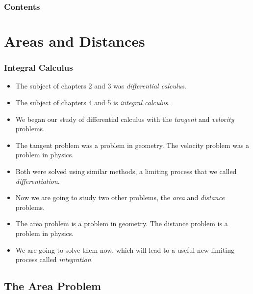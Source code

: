 \documentclass[serif,ignorenonframetext]{beamer}
\title{\commonTitleZeroFourOne}
\subtitle{\commonSubtitleZeroFourOne}
\author{\commonAuthor}
\institute{\commonInstitute}
\date{\commonDateZeroFourOne}
\begin{document}

\begin{frame}
  \titlepage
\end{frame}

\begin{frame}
  \frametitle{Contents}
  \tableofcontents
\end{frame}


\section{Areas and Distances}

\begin{frame}
  \frametitle{Integral Calculus}
  \begin{itemize}[<+->]
  \item The subject of chapters 2 and 3 was \textit{differential calculus}.
  \item The subject of chapters 4 and 5 is \textit{integral calculus}.
  \item We began our study of differential calculus with
    the \textit{tangent} and \textit{velocity} problems.
  \item The tangent problem was a problem in geometry.  The velocity problem
    was a problem in physics.  
  \item Both were solved using similar methods,
    a limiting process that we called \textit{differentiation}.
  \item Now we are going to study two other problems, the
    \textit{area} and \textit{distance} problems.
  \item The area problem is a problem in geometry.  The distance problem is
    a problem in physics.
  \item We are going to solve them now, which will lead to 
    a useful new limiting process called \textit{integration}.
  \end{itemize}
\end{frame}

\subsection{The Area Problem}
\end{document}
